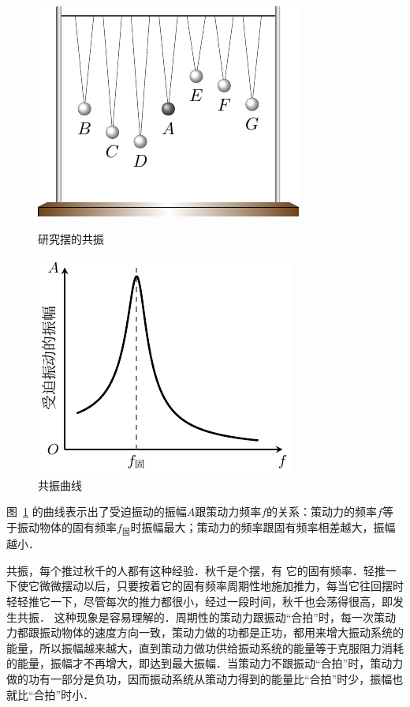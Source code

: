 \begin{figure}[htbp]
    \centering
    \begin{minipage}[b]{0.45\textwidth}
        \centering
        \includegraphics{fig/A/9-13.pdf}
        \caption{研究摆的共振}\label{fig_A_9-13}
    \end{minipage}
    \hfil
    \begin{minipage}[b]{0.45\textwidth}
        \centering
        \includegraphics{fig/A/9-14.pdf}
        \caption{共振曲线}\label{fig_A_9-14}
    \end{minipage}
\end{figure}


图~\ref{fig_A_9-14} 的曲线表示出了受迫振动的振幅$A$跟策动力频率$f$的关系：策动力的频率$f$等于振动物体的固有频率$f_{\text{固}}$时振幅最大；策动力的频率跟固有频率相差越大，振幅越小．


共振，每个推过秋千的人都有这种经验．秋千是个摆，有
它的固有频率．轻推一下使它微微摆动以后，只要按着它的固有频率周期性地施加推力，每当它往回摆时轻轻推它一下，尽管每次的推力都很小，经过一段时间，秋千也会荡得很高，即发生共振．
这种现象是容易理解的．周期性的策动力跟振动“合拍”时，每一次策动力都跟振动物体的速度方向一致，策动力做的功都是正功，都用来增大振动系统的能量，所以振幅越来越大，直到策动力做功供给振动系统的能量等于克服阻力消耗的能量，振幅才不再增大，即达到最大振幅．当策动力不跟振动“合拍”时，策动力做的功有一部分是负功，因而振动系统从策动力得到的能量比“合拍”时少，振幅也就比“合拍”时小．

